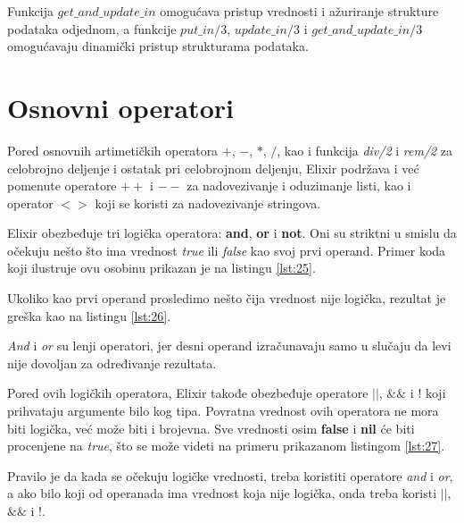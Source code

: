 \documentclass[12pt,oneside]{memoir}
\begin{document}
Funkcija $get\_and\_update\_in$ omogućava pristup vrednosti i ažuriranje strukture podataka odjednom, a funkcije $put\_in/3$, $update\_in/3$ i $get\_and\_update\_in/3$ omogućavaju dinamički pristup strukturama podataka.



\section{Osnovni operatori}

Pored osnovnih artimetičkih operatora $+$, $-$, $*$, $/$, kao i funkcija \textit{div/2} i \textit{rem/2} za celobrojno deljenje i ostatak pri celobrojnom deljenju, Elixir podržava i već pomenute operatore $++$ i $--$ za nadovezivanje i oduzimanje listi, kao i operator $<>$ koji se koristi za nadovezivanje stringova.

Elixir obezbeđuje tri logička operatora: \textbf{and}, \textbf{or} i \textbf{not}. Oni su striktni u smislu da očekuju nešto što ima vrednost \textit{true} ili \textit{false} kao svoj prvi operand. Primer koda koji ilustruje ovu osobinu prikazan je na listingu \ref{lst:25}.



\noindent Ukoliko kao prvi operand prosledimo nešto čija vrednost nije logička, rezultat je greška kao na listingu \ref{lst:26}.



\noindent \textit{And} i \textit{or} su lenji operatori, jer desni operand izračunavaju samo u slučaju da levi nije dovoljan za određivanje rezultata.

Pored ovih logičkih operatora, Elixir takođe obezbeđuje operatore $||$, $\&\&$ i $!$ koji prihvataju argumente bilo kog tipa. Povratna vrednost ovih operatora ne mora biti logička, već može biti i brojevna. Sve vrednosti osim \textbf{false} i \textbf{nil} će biti procenjene na \textit{true}, što se može videti na primeru prikazanom listingom \ref{lst:27}.



Pravilo je da kada se očekuju logičke vrednosti, treba koristiti operatore \textit{and} i \textit{or}, a ako bilo koji od operanada ima vrednost koja nije logička, onda treba koristi $||$, $\&\&$ i $!$.
\end{document}

